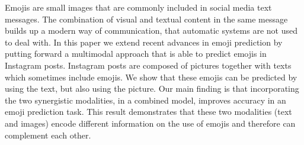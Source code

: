 Emojis are small images that are commonly included in social media text messages. The combination of visual and textual content in the same message builds up a modern way of communication, that automatic systems are not used to deal with. In this paper we extend recent advances in emoji prediction by putting forward a multimodal approach that is able to predict emojis in Instagram posts. Instagram posts are composed of pictures together with texts which  sometimes include emojis. We show that these emojis can be predicted by using the text, but also using the picture. Our main finding is that incorporating the two synergistic modalities, in a combined model, improves accuracy in an emoji prediction task. This result demonstrates that these two modalities (text and images) encode different information on the use of emojis and therefore  can complement each other.
